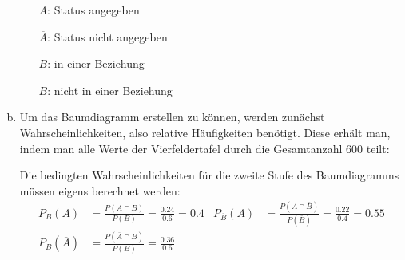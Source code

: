 \begin{exercise}
\begin{enumerate}[a)]
\begin{minipage}[c]{0.41\linewidth}
            \end{minipage}%
            \begin{minipage}[c]{0.58\linewidth}
              \begin{itemize}
                \renewcommand{\itemsep}{-1ex}%
                \item[$A$:]\glqq Status angegeben\grqq
                \item[$\overline{A}$:]\glqq Status nicht angegeben\grqq
                \item[$B$:]\glqq in einer Beziehung\grqq
                \item[$\overline{B}$:]\glqq nicht in einer Beziehung\grqq
              \end{itemize}
            \end{minipage}
      \item Um das Baumdiagramm erstellen zu können,
            werden zunächst Wahrscheinlichkeiten,
            also relative Häufigkeiten benötigt.
            Diese erhält man, indem man alle Werte
            der Vierfeldertafel durch die
            Gesamtanzahl \num{600} teilt:
            \begin{center}
              \begin{fofotab}%
              \end{fofotab}
            \end{center}
            Die bedingten Wahrscheinlichkeiten für
            die zweite Stufe des Baumdiagramms
            müssen eigens berechnet werden:
            \begin{align*}
              P_{B}(A)&=\frac{P(A\cap B)}{P(B)}
              =\frac{\num{0.24}}{\num{0.6}}
              =\num{0.4}
              &
              P_{\overline{B}}(A)&=\frac{P(A\cap\overline{B})}{P(\overline{B})}
              =\frac{\num{0.22}}{\num{0.4}}
              =\num{0.55}
              \\[1ex]
              P_{B}(\overline{A})&=\frac{P(\overline{A}\cap B)}{P(B)}
              =\frac{\num{0.36}}{\num{0.6}}

\end{align*}
\end{enumerate}
\end{exercise}
